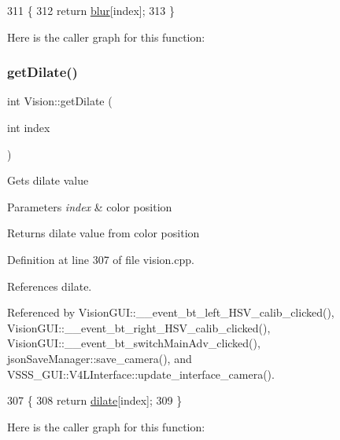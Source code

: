 \begin{DoxyCode}
311                              \{
312     \textcolor{keywordflow}{return} \hyperlink{class_vision_a48d1a64140429848f9a75a9d46c6e920}{blur}[index];
313 \}
\end{DoxyCode}
Here is the caller graph for this function\+:
\mbox{\label{class_vision_a0d07157e3d9bb577940f03365c8f57e8}} 
\subsubsection{\texorpdfstring{get\+Dilate()}{getDilate()}}
{\footnotesize\ttfamily int Vision\+::get\+Dilate (\begin{DoxyParamCaption}\item[{int}]{index }\end{DoxyParamCaption})}

Gets dilate value 
\begin{DoxyParams}{Parameters}
{\em index} & color position \\
\hline
\end{DoxyParams}
\begin{DoxyReturn}{Returns}
dilate value from color position 
\end{DoxyReturn}


Definition at line 307 of file vision.\+cpp.



References dilate.



Referenced by Vision\+G\+U\+I\+::\+\_\+\+\_\+event\+\_\+bt\+\_\+left\+\_\+\+H\+S\+V\+\_\+calib\+\_\+clicked(), Vision\+G\+U\+I\+::\+\_\+\+\_\+event\+\_\+bt\+\_\+right\+\_\+\+H\+S\+V\+\_\+calib\+\_\+clicked(), Vision\+G\+U\+I\+::\+\_\+\+\_\+event\+\_\+bt\+\_\+switch\+Main\+Adv\+\_\+clicked(), json\+Save\+Manager\+::save\+\_\+camera(), and V\+S\+S\+S\+\_\+\+G\+U\+I\+::\+V4\+L\+Interface\+::update\+\_\+interface\+\_\+camera().


\begin{DoxyCode}
307                                \{
308     \textcolor{keywordflow}{return} \hyperlink{class_vision_a406af58255882218a4d49f41b7e3a67a}{dilate}[index];
309 \}
\end{DoxyCode}
Here is the caller graph for this function\+:
\mbox{\label{class_vision_a6cc4617b0af832b4cb94e00cc845c317}} 
